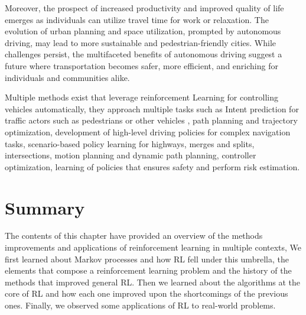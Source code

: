 Moreover, the prospect of increased productivity and improved quality of life emerges as individuals can utilize travel time for work or relaxation. The evolution of urban planning and space utilization, prompted by autonomous driving, may lead to more sustainable and pedestrian-friendly cities. While challenges persist, the multifaceted benefits of autonomous driving suggest a future where transportation becomes safer, more efficient, and enriching for individuals and communities alike.

Multiple methods exist that leverage reinforcement Learning for controlling vehicles automatically, they approach multiple tasks such as Intent prediction for traffic actors such as pedestrians or other vehicles \cite{}, path planning and trajectory optimization\cite{}, development of high-level driving policies for complex navigation tasks\cite{},  scenario-based policy learning for highways\cite{}, merges and splits\cite{}, intersections\cite{}, motion planning and dynamic path planning\cite{}, controller optimization\cite{}, learning of policies that ensures safety and perform risk estimation\cite{}.

\section{Summary}\label{sec:rl-summary}
The contents of this chapter have provided an overview of the methods improvements and applications of reinforcement learning in multiple contexts, We first learned about Markov processes and how RL fell under this umbrella, the elements that compose a reinforcement learning problem and the history of the methods that improved general RL. Then we learned about the algorithms at the core of RL and how each one improved upon the shortcomings of the previous ones. Finally, we observed some applications of RL to real-world problems.

